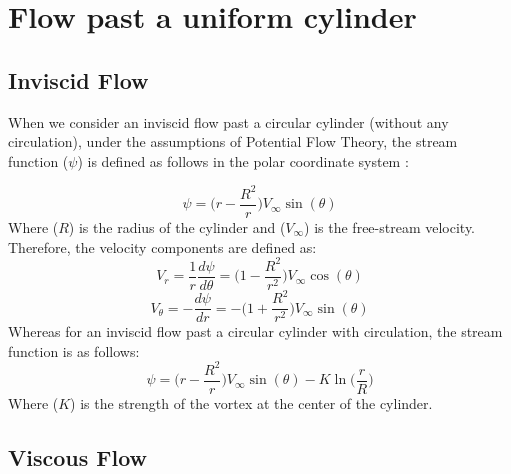 \chapter{Flow past a uniform cylinder} %
\label{Chapter2}

\section{Inviscid Flow}

When we consider an inviscid flow past a circular cylinder (without any circulation), under the assumptions of Potential Flow Theory, the stream function ($\psi$) is defined as follows in the polar coordinate system \parencite{White2018-ai}:

\begin{equation}
	\psi = \bigg(r - \frac{R^{2}}{r}\bigg) V_{\infty} \sin(\theta)
\end{equation}
Where ($R$) is the radius of the cylinder and ($V_{\infty}$) is the free-stream velocity. Therefore, the velocity components are defined as:
\begin{equation}
	V_r = \frac{1}{r} \frac{d \psi}{d \theta}=  \bigg(1 - \frac{R^{2}}{r^2}\bigg) V_{\infty} \cos(\theta)
\end{equation}
\begin{equation}
	V_{\theta} = - \frac{d \psi}{d r} =  - \bigg(1 + \frac{R^{2}}{r^2}\bigg) V_{\infty} \sin(\theta)
\end{equation}
Whereas for an inviscid flow past a circular cylinder with circulation, the stream function is as follows:
\begin{equation}
	\psi = \bigg(r - \frac{R^{2}}{r}\bigg) V_{\infty} \sin(\theta) - K\ln\big(\frac{r}{R}\big)
\end{equation}
Where ($K$) is the strength of the vortex at the center of the cylinder.


\section{Viscous Flow}

